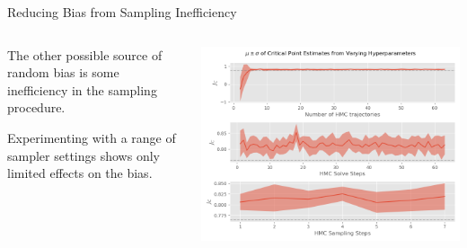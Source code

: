 \documentclass[aspectratio=169, 12pt]{beamer}
\begin{document}
\begin{frame}{Reducing Bias from Sampling Inefficiency}

    \begin{columns}
        \begin{column}{.4\textwidth}
            
            The other possible source of random bias is some inefficiency in the sampling procedure. 

            \vspace{1em}
            
            Experimenting with a range of sampler settings shows only limited effects on the bias. 
            
        \end{column}
        \begin{column}{.6\textwidth}
            \includegraphics[width=\textwidth]{images/hmc-hyperparameters.png}
        \end{column}
    \end{columns}
    
\end{frame}
\end{document}
